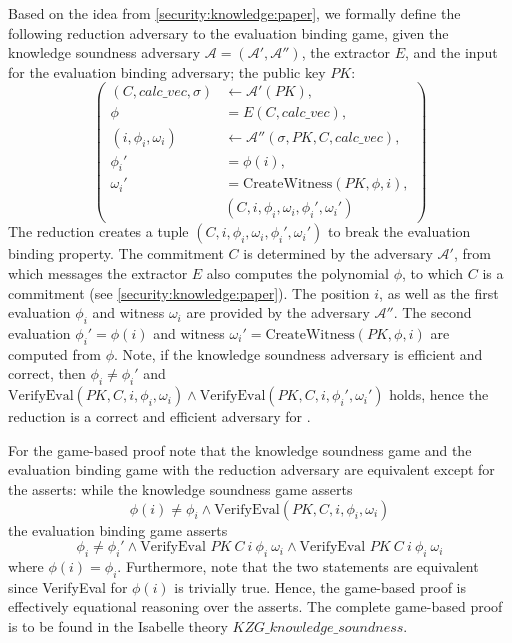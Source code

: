 Based on the idea from \ref{security:knowledge:paper}, we formally define the following reduction adversary to the evaluation binding game, given the knowledge soundness adversary $\mathcal{A=(A',A'')}$, the extractor $E$, and the input for the evaluation binding adversary; the public key $PK$:
\begin{equation*}
    \left(
        \begin{aligned}
            (C,calc\_vec, \sigma) &\leftarrow \mathcal{A'}(PK), \\
            \phi &= E(C, calc\_vec),\\
            (i, \phi_i, \omega_i) &\leftarrow \mathcal{A''}(\sigma, PK, C, calc\_vec), \\
            \phi_i' &= \phi(i), \\
            \omega_i' &= \text{CreateWitness}(PK,\phi, i), \\
            &  (C, i, \phi_i, \omega_i, \phi_i', \omega_i')
        \end{aligned}
        \right)
\end{equation*}
The reduction creates a tuple $(C, i, \phi_i, \omega_i, \phi_i', \omega_i')$ to break the evaluation binding property. The commitment $C$ is determined by the adversary $\mathcal{A'}$, from which messages the extractor $E$ also computes the polynomial $\phi$, to which $C$ is a commitment (see \ref{security:knowledge:paper}). The position $i$, as well as the first evaluation $\phi_i$ and witness $\omega_i$ are provided by the adversary $\mathcal{A''}$. The second evaluation $\phi_i'=\phi(i)$ and witness $\omega_i'= \text{CreateWitness}(PK,\phi, i)$ are computed from $\phi$. Note, if the knowledge soundness adversary is efficient and correct, then $\phi_i\ne\phi_i'$ and $\text{VerifyEval}(PK,C,i,\phi_i,\omega_i) \land \text{VerifyEval}(PK,C,i,\phi_i',\omega_i')$ holds, hence the reduction is a correct and efficient adversary for . 

For the game-based proof note that the knowledge soundness game and the evaluation binding game with the reduction adversary are equivalent except for the asserts: while the knowledge soundness game asserts 
$$\phi(i) \ne \phi_i \land \text{VerifyEval}(PK, C, i,\phi_i,\omega_i)$$ the evaluation binding game asserts 
$$\phi_i \ne \phi_i' \land \text{VerifyEval } PK\ C\ i\ \phi_i\ \omega_i \land \text{VerifyEval } PK\ C\ i\ \phi_i\ \omega_i$$ where $\phi(i)=\phi_i$. Furthermore, note that the two statements are equivalent since VerifyEval for $\phi(i)$ is trivially true. Hence, the game-based proof is effectively equational reasoning over the asserts. The complete game-based proof is to be found in the Isabelle theory $KZG\_knowledge\_soundness$.

